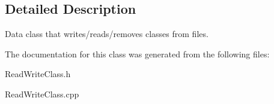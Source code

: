 \subsection{Detailed Description}
Data class that writes/reads/removes classes from files. 



The documentation for this class was generated from the following files:\begin{CompactItemize}
\item 
Read\-Write\-Class.h\item 
Read\-Write\-Class.cpp\end{CompactItemize}
